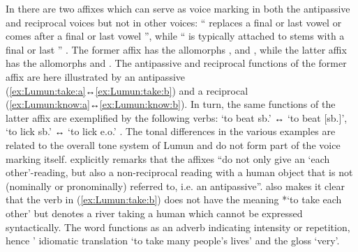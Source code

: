 In  there are two affixes which can serve as voice marking in both the antipassive and reciprocal voices but not in other voices: “ replaces a final or last vowel  or comes after a final or last vowel ”, while “ is typically attached to stems with a final or last ” \citep[550f.]{smits:2017}. The former affix has the allomorphs ,  and , while the latter affix has the allomorphs  and . The antipassive and reciprocal functions of the former affix are here illustrated by an antipassive  (\ref{ex:Lumun:take:a}↔\ref{ex:Lumun:take:b}) and a reciprocal  (\ref{ex:Lumun:know:a}↔\ref{ex:Lumun:know:b}). In turn, the same functions of the latter affix are exemplified by the following verbs:  ‘to beat sb.’ ↔  ‘to beat [sb.]’,  ‘to lick sb.’ ↔  ‘to lick e.o.’ \citep[551, 559, 734]{smits:2017}. The tonal differences in the various examples are related to the overall tone system of Lumun and do not form part of the voice marking itself. \citet[558]{smits:2017} explicitly remarks that the  affixes “do not only give an ‘each other’-reading, but also a non-reciprocal reading with a human object that is not (nominally or pronominally) referred to, i.e. an antipassive”. \citeauthor{smits:2017} also makes it clear that the verb in (\ref{ex:Lumun:take:b}) does not have the meaning *‘to take each other’ but denotes a river taking a human  which cannot be expressed syntactically. The word  functions as an adverb indicating intensity or repetition, hence \citeauthor{smits:2017}’ idiomatic translation ‘to take many people’s lives’ and the gloss ‘very’. 

